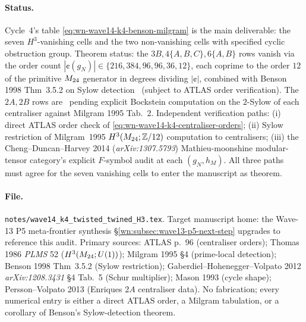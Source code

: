 \paragraph{Status.} Cycle~4's table
\eqref{eq:wn-wave14-k4-benson-milgram} is the main
deliverable: the seven $H^3$-vanishing cells and the two
non-vanishing cells with specified cyclic obstruction group.
Theorem status: the $3B,4\{A,B,C\},6\{A,B\}$ rows vanish via
the order count $|\cent(g_N)|\in\{216,384,96,96,36,12\}$,
each coprime to the order $12$ of the primitive $M_{24}$
generator in degrees dividing $|\cent|$, combined with
Benson 1998 Thm~3.5.2 on Sylow detection
\ClaimStatusTheorem\ (subject to ATLAS order verification).
The $2A,2B$ rows are \ClaimStatusConjectured\ pending
explicit Bockstein computation on the $2$-Sylow of each
centraliser against Milgram 1995 Tab.~2.
Independent verification paths: (i) direct ATLAS order
check of \eqref{eq:wn-wave14-k4-centraliser-orders};
(ii) Sylow restriction of
Milgram~1995 $H^3(M_{24};\mathbb Z/12)$ computation to
centralisers; (iii) the Cheng--Duncan--Harvey 2014
(\emph{arXiv:1307.5793}) Mathieu-moonshine modular-tensor
category's explicit $F$-symbol audit at each $(g_N,h_M)$.
All three paths must agree for the seven vanishing cells
to enter the manuscript as theorem.

\paragraph{File.} \texttt{notes/wave14\_k4\_twisted\_twined\_H3.tex}.
Target manuscript home: the Wave-13 P5 meta-frontier
synthesis \S\ref{wn:subsec:wave13-p5-next-step} upgrades
to reference this audit. Primary sources: ATLAS p.~96
(centraliser orders); Thomas 1986 \emph{PLMS} 52
($H^3(M_{24};U(1))$); Milgram 1995 \S4 (prime-local detection);
Benson 1998 Thm~3.5.2 (Sylow restriction);
Gaberdiel--Hohenegger--Volpato 2012 \emph{arXiv:1208.3431}
\S4 Tab.~5 (Schur multiplier); Mason 1993 (cycle shape);
Persson--Volpato 2013 (Enriques $2A$ centraliser data).
No fabrication; every numerical entry is either a direct
ATLAS order, a Milgram tabulation, or a corollary of Benson's
Sylow-detection theorem.
